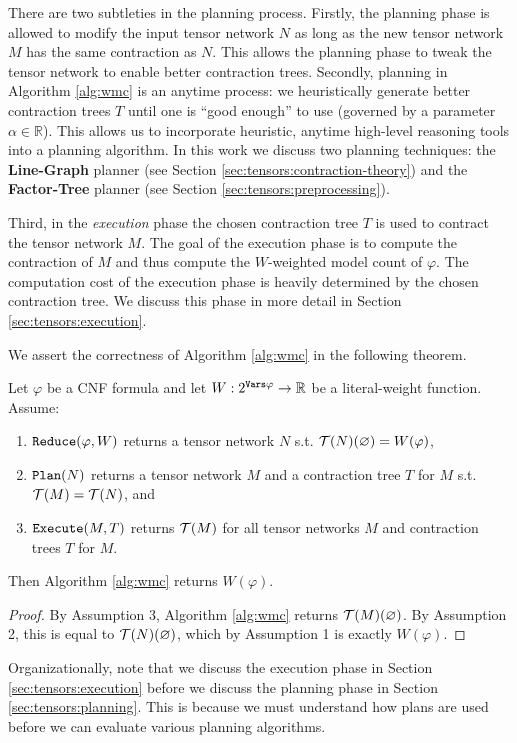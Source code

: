 There are two subtleties in the planning process. 
Firstly, the planning phase is allowed to modify the input tensor network $N$ as long as the new tensor network $M$ has the same contraction as $N$. 
This allows the planning phase to tweak the tensor network to enable better contraction trees.
Secondly, planning in Algorithm \ref{alg:wmc} is an anytime process: we heuristically generate better contraction trees $T$ until one is ``good enough'' to use (governed by a parameter $\alpha \in \mathbb{R}$). 
This allows us to incorporate heuristic, anytime high-level reasoning tools into a planning algorithm. 
In this work we discuss two planning techniques: the \textbf{Line-Graph} planner (see Section \ref{sec:tensors:contraction-theory}) and the \textbf{Factor-Tree} planner (see Section \ref{sec:tensors:preprocessing}).

Third, in the \emph{execution} phase the chosen contraction tree $T$ is used to contract the tensor network $M$.
The goal of the execution phase is to compute the contraction of $M$ and thus compute the $W$-weighted model count of $\varphi$. The computation cost of the execution phase is heavily determined by the chosen contraction tree. We discuss this phase in more detail in Section \ref{sec:tensors:execution}.

We assert the correctness of Algorithm \ref{alg:wmc} in the following theorem.
\begin{theorem}
\label{thm:alg-correctness}
Let $\varphi$ be a CNF formula and let $W: 2^{\texttt{\upshape Vars}{\varphi}} \rightarrow \mathbb{R}$ be a literal-weight function.
    Assume:
    \begin{enumerate}
        \item $\texttt{\upshape Reduce}(\varphi, W)$ returns a tensor network $N$ s.t. $\mathcal{T}(N)(\varnothing) = W(\varphi)$,
        \item $\texttt{\upshape Plan}(N)$ returns a tensor network $M$ and a contraction tree $T$ for $M$ s.t. $\mathcal{T}(M) = \mathcal{T}(N)$, and
        \item $\texttt{\upshape Execute}(M, T)$ returns $\mathcal{T}(M)$ for all tensor networks $M$ and contraction trees $T$ for $M$.
    \end{enumerate}
Then Algorithm \ref{alg:wmc} returns $W(\varphi)$.
\end{theorem}
\begin{proof}
By Assumption 3, Algorithm \ref{alg:wmc} returns $\mathcal{T}(M)(\varnothing)$. 
By Assumption 2, this is equal to $\mathcal{T}(N)(\varnothing)$, which by Assumption 1 is exactly $W(\varphi)$.
\end{proof}

Organizationally, note that we discuss the execution phase in Section \ref{sec:tensors:execution} before we discuss the planning phase in Section \ref{sec:tensors:planning}. 
This is because we must understand how plans are used before we can evaluate various planning algorithms.
